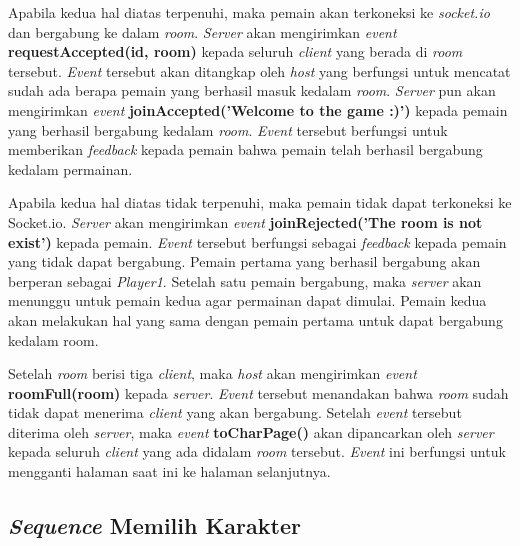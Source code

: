 Apabila kedua hal diatas terpenuhi, maka pemain akan terkoneksi ke \textit{socket.io} dan bergabung ke dalam \textit{room}. \textit{Server} akan mengirimkan \textit{event} \textbf{requestAccepted(id, room)} kepada seluruh \textit{client} yang berada di \textit{room} tersebut. \textit{Event} tersebut akan ditangkap oleh \textit{host} yang berfungsi untuk mencatat sudah ada berapa pemain yang berhasil masuk kedalam \textit{room}. \textit{Server} pun akan mengirimkan \textit{event} \textbf{joinAccepted('Welcome to the game :)')} kepada pemain yang berhasil bergabung kedalam \textit{room}. \textit{Event} tersebut berfungsi untuk memberikan \textit{feedback} kepada pemain bahwa pemain telah berhasil bergabung kedalam permainan.

Apabila kedua hal diatas tidak terpenuhi, maka pemain tidak dapat terkoneksi ke Socket.io. \textit{Server} akan mengirimkan \textit{event} \textbf{joinRejected('The room is not exist')} kepada pemain. \textit{Event} tersebut berfungsi sebagai \textit{feedback} kepada pemain yang tidak dapat bergabung. Pemain pertama yang berhasil bergabung akan berperan sebagai \textit{Player1}. Setelah satu pemain bergabung, maka \textit{server} akan menunggu untuk pemain kedua agar permainan dapat dimulai. Pemain kedua akan melakukan hal yang sama dengan pemain pertama untuk dapat bergabung kedalam room.

Setelah \textit{room} berisi tiga \textit{client}, maka \textit{host} akan mengirimkan \textit{event} \textbf{roomFull(room)} kepada \textit{server}. \textit{Event} tersebut menandakan bahwa \textit{room} sudah tidak dapat menerima \textit{client} yang akan bergabung. Setelah \textit{event} tersebut diterima oleh \textit{server}, maka \textit{event} \textbf{toCharPage()} akan dipancarkan oleh \textit{server} kepada seluruh \textit{client} yang ada didalam \textit{room} tersebut. \textit{Event} ini berfungsi untuk mengganti halaman saat ini ke halaman selanjutnya.

\subsection{\textit{Sequence} Memilih Karakter}

